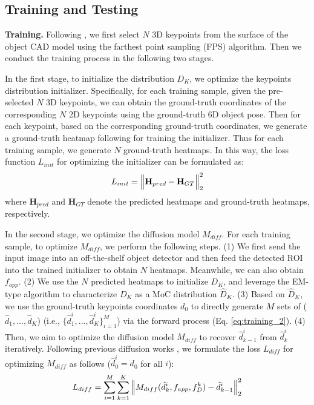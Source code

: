 \documentclass[10pt,twocolumn,letterpaper]{article}
\begin{document}
\subsection{Training and Testing}
\label{Sec:overall}
\noindent\textbf{Training.} 
Following \cite{peng2019pvnet}, we first select $N$ 3D keypoints from the surface of the object CAD model using the farthest point sampling (FPS) algorithm. Then we conduct the training process in the following two stages. 

In the first stage, to initialize the distribution $D_K$, we optimize the keypoints distribution initializer.
Specifically, for each training sample, given the pre-selected $N$ 3D keypoints, we can obtain the ground-truth coordinates of the corresponding $N$ 2D keypoints using the ground-truth 6D object pose.
Then for each keypoint, based on the corresponding ground-truth coordinates, we generate a ground-truth heatmap following \cite{oberweger2018making} for training the initializer.
Thus for each training sample, we generate $N$ ground-truth heatmaps.
In this way, the loss function $L_{init}$ for optimizing the initializer can be formulated as:
\begin{equation}\label{eq:loss1}
\setlength{\abovedisplayskip}{3pt}
\setlength{\belowdisplayskip}{3pt}
\begin{aligned}
L_{init} = {\Big\Vert \textbf{H}_{pred} - \textbf{H}_{GT} \Big\Vert}^2_2
\end{aligned}
\end{equation}
where $\textbf{H}_{pred}$ and $\textbf{H}_{GT}$ denote the predicted heatmaps and ground-truth heatmaps, respectively.

In the second stage, we optimize the diffusion model $M_{diff}$. 
For each training sample, to optimize $M_{diff}$, we perform the following steps. 
(1) We first send the input image into an off-the-shelf object detector \cite{tian2019fcos} and then feed the detected ROI into the trained initializer to obtain $N$ heatmaps.
Meanwhile, we can also obtain $f_{app}$. 
(2) We use the $N$ predicted heatmaps to initialize $D_K$, and leverage the EM-type algorithm to characterize $D_K$ as a MoC distribution $\hat{D}_K$. 
(3) Based on $\hat{D}_K$, we use the ground-truth keypoints coordinates $d_0$ to directly generate $M$ sets of ($\hat{d}_1,..., \hat{d}_K$) (i.e., $\{\hat{d}^i_1,..., \hat{d}^i_K\}^{M}_{i=1}$) via the forward process (Eq. \ref{eq:training_2}).
(4) Then, we aim to optimize the diffusion model $M_{diff}$ to recover $\hat{d}^i_{k-1}$ from $\hat{d}^i_k$ iteratively. Following previous diffusion works \cite{NEURIPS2020_DDPM, song2021denoising}, we formulate the loss $L_{diff}$ for optimizing $M_{diff}$ as follows ($\hat{d}^i_0=d_0$ for all $i$):
\begin{equation}\label{eq:loss1}
\setlength{\abovedisplayskip}{3pt}
\setlength{\belowdisplayskip}{3pt}
\begin{aligned}
L_{diff} = \sum^M_{i=1}\sum^K_{k=1} {\Big\Vert M_{diff}(\hat{d}^i_{k}, f_{app}, f^k_D) - \hat{d}^i_{k-1} \Big\Vert}^2_2
\end{aligned}
\end{equation}
\end{document}
